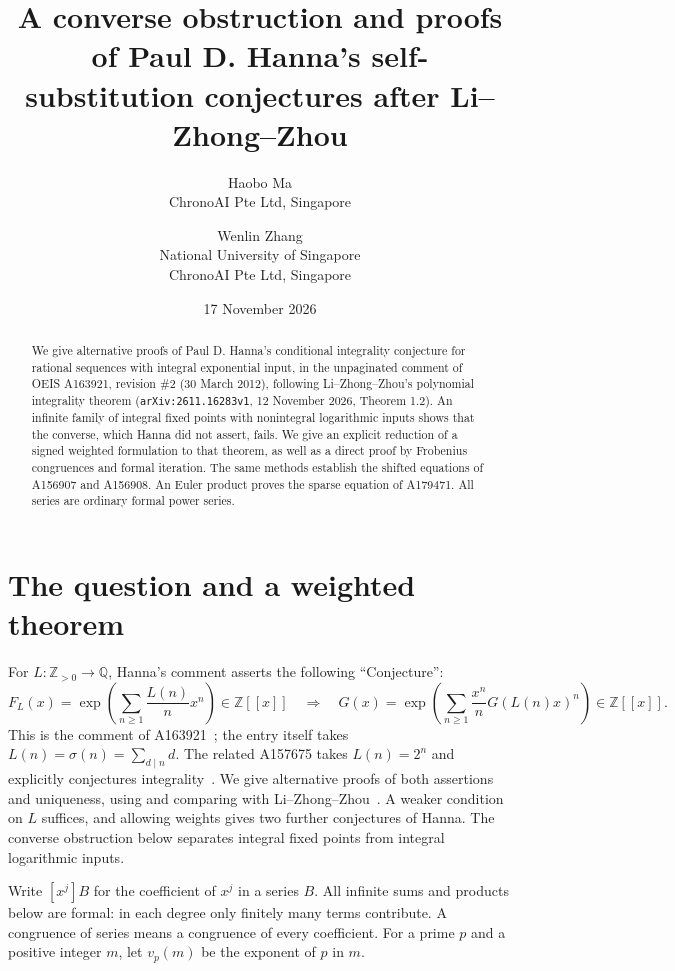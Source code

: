 \documentclass[11pt]{article}
\title{A converse obstruction and proofs of Paul D. Hanna's self-substitution conjectures after Li--Zhong--Zhou}
\author{Haobo Ma\\\small ChronoAI Pte Ltd, Singapore
\and Wenlin Zhang\\\small National University of Singapore\\\small ChronoAI Pte Ltd, Singapore}
\date{17 November 2026}
\newcommand{\Z}{\mathbb Z}
\newcommand{\Q}{\mathbb Q}
\begin{document}
\maketitle
\begin{abstract}
We give alternative proofs of Paul D. Hanna's conditional integrality
conjecture for rational sequences with integral exponential input, in the
unpaginated comment of OEIS A163921, revision \#2
(30 March 2012), following Li--Zhong--Zhou's polynomial integrality theorem
(\nolinkurl{arXiv:2611.16283v1}, 12 November 2026, Theorem 1.2).
An infinite family of integral fixed points with nonintegral logarithmic
inputs shows that the converse, which Hanna did not assert, fails.
We give an explicit reduction of a signed weighted formulation to that
theorem, as well as a direct proof by Frobenius congruences and formal
iteration. The same methods establish the shifted equations of A156907
and A156908. An Euler product proves the sparse equation of A179471.
All series are ordinary formal power series.
\end{abstract}

\section{The question and a weighted theorem}

For $L:\Z_{>0}\to\Q$, Hanna's comment asserts the following ``Conjecture'':
\begin{equation}\label{input}
 F_L(x)=\exp\left(\sum_{n\geq1}\frac{L(n)}{n}x^n\right)\in\Z[[x]]
 \quad\Longrightarrow\quad
 G(x)=\exp\left(\sum_{n\geq1}\frac{x^n}{n}G(L(n)x)^n\right)\in\Z[[x]].
\end{equation}
This is the comment of A163921~\cite{oeis163921}; the entry itself takes
$L(n)=\sigma(n)=\sum_{d\mid n}d$. The related A157675 takes $L(n)=2^n$
and explicitly conjectures integrality~\cite{oeis157675}.
We give alternative proofs of both assertions and uniqueness, using and
comparing with Li--Zhong--Zhou~\cite[Theorem 1.2]{lzz}.
A weaker condition on $L$ suffices, and allowing weights gives two further
conjectures of Hanna. The converse obstruction below separates integral
fixed points from integral logarithmic inputs.

Write $[x^j]B$ for the coefficient of $x^j$ in a series $B$.
All infinite sums and products below are formal: in each degree only finitely
many terms contribute. A congruence of series means a congruence of every
coefficient. For a prime $p$ and a positive integer $m$, let $v_p(m)$ be
the exponent of $p$ in $m$.
\end{document}

